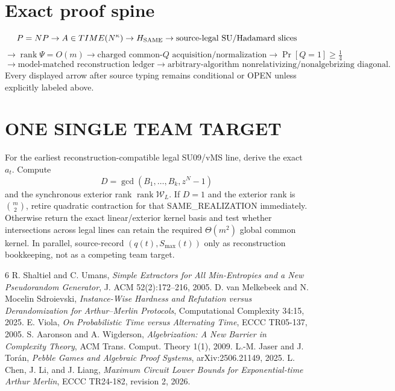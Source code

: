 \documentclass[11pt]{article}
\begin{document}
\section*{Exact proof spine}
\[
P=NP\to A\in TIME(N^\kappa)\to H_{\rm SAME}
\to\text{source-legal SU/Hadamard slices}
\]
\[
\to\boxed{\operatorname{rank}\Psi=O(m)}
\to\text{charged common-}Q\text{ acquisition/normalization}
\to\Pr[Q=1]\ge\tfrac14
\]
\[
\to\text{model-matched reconstruction ledger}
\to\boxed{\text{arbitrary-algorithm nonrelativizing/nonalgebrizing diagonal}}.
\]
Every displayed arrow after source typing remains conditional or OPEN unless explicitly labeled above.

\section*{ONE SINGLE TEAM TARGET}

For the earliest reconstruction-compatible legal SU09/vMS line, derive the exact \(a_t\). Compute
\[
D=\gcd(B_1,\ldots,B_k,z^N-1)
\]
and the synchronous exterior rank \(\operatorname{rank}\mathcal W_L\). If \(D=1\) and the exterior rank is \(\binom m2\), retire quadratic contraction for that SAME\_REALIZATION immediately. Otherwise return the exact linear/exterior kernel basis and test whether intersections across legal lines can retain the required \(\Theta(m^2)\) global common kernel. In parallel, source-record \((q(t),S_{\max}(t))\) only as reconstruction bookkeeping, not as a competing team target.

\begin{thebibliography}{6}
 R. Shaltiel and C. Umans, \emph{Simple Extractors for All Min-Entropies and a New Pseudorandom Generator}, J. ACM 52(2):172--216, 2005.
 D. van Melkebeek and N. Mocelin Sdroievski, \emph{Instance-Wise Hardness and Refutation versus Derandomization for Arthur--Merlin Protocols}, Computational Complexity 34:15, 2025.
 E. Viola, \emph{On Probabilistic Time versus Alternating Time}, ECCC TR05-137, 2005.
 S. Aaronson and A. Wigderson, \emph{Algebrization: A New Barrier in Complexity Theory}, ACM Trans. Comput. Theory 1(1), 2009.
 L.-M. Jaser and J. Tor\'an, \emph{Pebble Games and Algebraic Proof Systems}, arXiv:2506.21149, 2025.
 L. Chen, J. Li, and J. Liang, \emph{Maximum Circuit Lower Bounds for Exponential-time Arthur Merlin}, ECCC TR24-182, revision 2, 2026.
\end{thebibliography}
\end{document}
